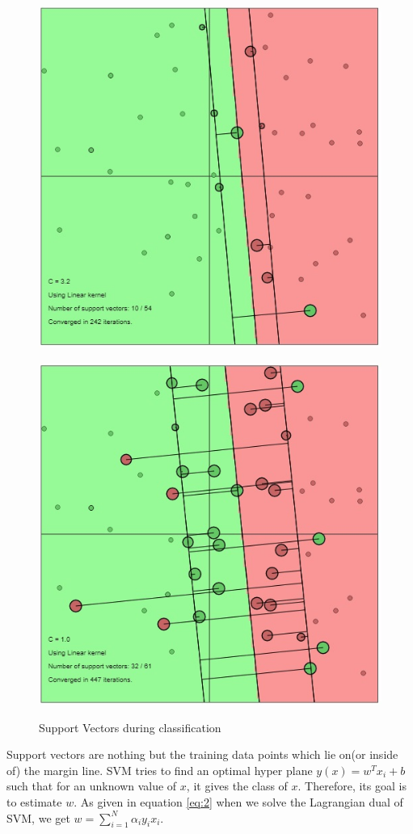 \documentclass[12pt]{report}
\begin{document}
{\begin{figure}
	\begin{minipage}{\linewidth}
		\centering\captionsetup[subfigure]{justification=centering}
		\includegraphics[width=0.65\linewidth]{lin_SV1.jpg}
		\label{fig:SV1}\par\vfill
		\includegraphics[width=0.65\linewidth]{lin_SV2.jpg}
		\label{fig:SV2}
	\end{minipage}
	\caption{Support Vectors during classification}
	\label{fig:SV}
\end{figure}
Support vectors are nothing but the training data points which lie on(or inside of) the margin line. SVM tries to find an optimal hyper plane $y(x) = w^Tx_i+b$ such that for an unknown value of $x$, it gives the class of $x$. Therefore, its goal is to estimate $w$. As given in equation \ref{eq:2} when we solve the Lagrangian dual of SVM, we get $w = \sum_{i=1}^{N} \alpha_i y_i x_i $. 
}
\end{document}
